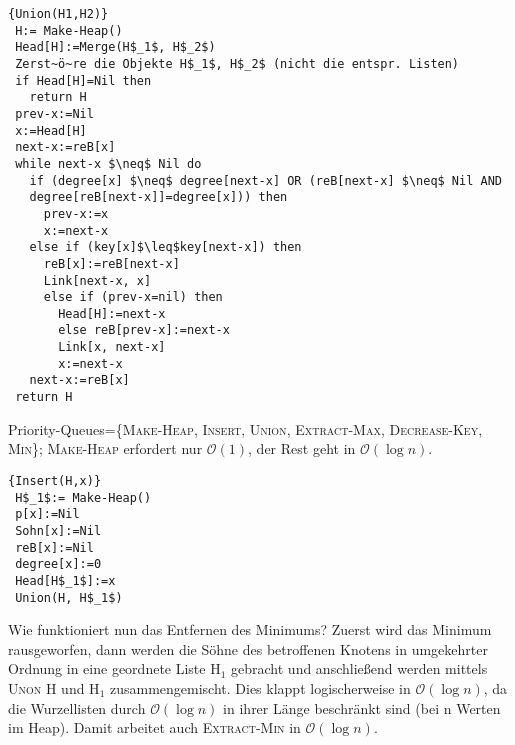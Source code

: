 \documentclass[ngerman,draft,parskip=half*,twoside]{scrreprt}
\theoremstyle{break}
\theoremstyle{nonumberbreak}
\newcommand*{\OO}{\mathcal{O}}      %
\begin{document}
\begin{Algorithmus}[H]
\begin{lstlisting}[frame=tlrb, mathescape=true, title=\textsc{Union\textnormal{(H$_1$, H$_2$)}}, gobble=1]{Union(H1,H2)}
 H:= Make-Heap()
 Head[H]:=Merge(H$_1$, H$_2$)
 Zerst~ö~re die Objekte H$_1$, H$_2$ (nicht die entspr. Listen)
 if Head[H]=Nil then
   return H
 prev-x:=Nil
 x:=Head[H]
 next-x:=reB[x]
 while next-x $\neq$ Nil do
   if (degree[x] $\neq$ degree[next-x] OR (reB[next-x] $\neq$ Nil AND 
   degree[reB[next-x]]=degree[x])) then
     prev-x:=x
     x:=next-x
   else if (key[x]$\leq$key[next-x]) then
     reB[x]:=reB[next-x]
     Link[next-x, x]
     else if (prev-x=nil) then
       Head[H]:=next-x
       else reB[prev-x]:=next-x
       Link[x, next-x]
       x:=next-x
   next-x:=reB[x]
 return H    
\end{lstlisting}
\end{Algorithmus}

Priority-Queues=\{\textsc{Make-Heap}, \textsc{Insert}, \textsc{Union}, \textsc{Extract-Max}, \textsc{Decrease-Key},
\textsc{Min}\};
\textsc{Make-Heap} erfordert nur $\OO(1)$, der Rest geht in $\OO(\log n)$.
 

\begin{Algorithmus}[H]
\begin{lstlisting}[frame=tlrb, mathescape=true, title=\textsc{Insert\textnormal{(H, x)}}, gobble=1]{Insert(H,x)}
 H$_1$:= Make-Heap()
 p[x]:=Nil
 Sohn[x]:=Nil
 reB[x]:=Nil
 degree[x]:=0
 Head[H$_1$]:=x
 Union(H, H$_1$) 
\end{lstlisting}
\end{Algorithmus}

Wie funktioniert nun das Entfernen des Minimums? Zuerst wird das Minimum rausgeworfen, dann werden die Söhne des
betroffenen Knotens in umgekehrter Ordnung in eine geordnete Liste H$_1$ gebracht und anschließend werden mittels
\textsc{Unon} H und H$_1$ zusammengemischt. Dies klappt logischerweise in $\OO(\log n)$, da die Wurzellisten durch $\OO(\log
n)$ in ihrer Länge beschränkt sind (bei n Werten im Heap). Damit arbeitet auch \textsc{Extract-Min} in $\OO(\log n)$.
\end{document}
